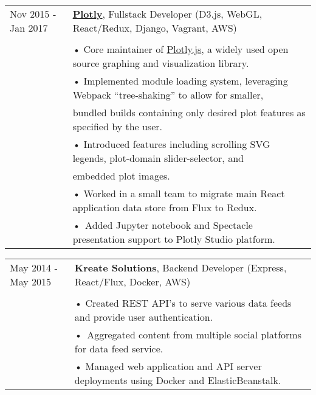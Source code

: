 \documentclass[10pt,notitlepage,oneside,draft]{article}
\begin{document}
\begin{flushleft}
  \vspace{12pt}

  \begin{tabular}{p{78pt} | l}
      \scriptsize Nov 2015 ‐ Jan 2017 & \textbf{\href{https://plot.ly}{Plotly}}, Fullstack Developer  (\footnotesize D3.js, WebGL, React/Redux, Django, Vagrant, AWS)\\
    \\
    & • Core maintainer of \href{https://github.com/plotly/plotly.js}{Plotly.js}, a widely used open source graphing and visualization library. \\
    & • Implemented module loading system, leveraging Webpack ``tree-shaking'' to allow for smaller, \\
    & \hspace{5pt} bundled builds containing only desired plot features as specified by the user. \\
    & • Introduced features including scrolling SVG legends, plot-domain slider-selector, and \\
    & \hspace{5pt} embedded plot images. \\
    & • Worked in a small team to migrate main React application data store from Flux to Redux. \\
    & • Added Jupyter notebook and Spectacle presentation support to Plotly Studio platform. \\
  \end{tabular}

  \vspace{12pt}

  \begin{tabular}{p{78pt} | l}
      \scriptsize May 2014 ‐ May 2015 & \textbf{Kreate Solutions}, Backend Developer (\footnotesize Express, React/Flux, Docker, AWS)\\
    \\
    & • Created REST API's to serve various data feeds and provide user authentication. \\
    & • Aggregated content from multiple social platforms for data feed service. \\
    & • Managed web application and API server deployments using Docker and ElasticBeanstalk. \\
  \end{tabular}

  \vspace{12pt}


\end{flushleft}
\end{document}
